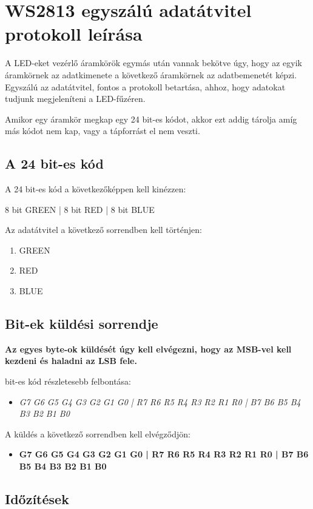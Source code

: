 \documentclass[10pt]{article} %
\begin{document}
\section{WS2813 egyszálú adatátvitel protokoll leírása}

\indent A LED-eket vezérlő áramkörök egymás után vannak bekötve úgy, hogy az egyik áramkörnek az adatkimenete a következő áramkörnek az adatbemenetét képzi. Egyszálú az adatátvitel, fontos a protokoll betartása, ahhoz, hogy adatokat tudjunk megjeleníteni a LED-fűzéren.

Amikor egy áramkör megkap egy 24 bit-es kódot, akkor ezt addig tárolja amíg más kódot nem kap, vagy a tápforrást el nem veszti.

\subsection{A 24 bit-es kód}

A 24 bit-es kód a következőképpen kell kinézzen:

8 bit GREEN | 8 bit RED | 8 bit BLUE

Az adatátvitel a következő sorrendben kell történjen: 
\begin{enumerate}
	\item GREEN
	\item RED
	\item BLUE
\end{enumerate}

\subsection{Bit-ek küldési sorrendje}

\textbf{Az egyes byte-ok küldését úgy kell elvégezni, hogy az MSB-vel kell kezdeni és haladni az LSB fele.}

 bit-es kód részletesebb felbontása: 
\begin{itemize}
\item \textit{G7 G6 G5 G4 G3 G2 G1 G0 | R7 R6 R5 R4 R3 R2 R1 R0 | B7 B6 B5 B4 B3 B2 B1 B0}
\end{itemize}

\noindent A küldés a következő sorrendben kell elvégződjön: 
\begin{itemize}
\item \textbf{G7 G6 G5 G4 G3 G2 G1 G0 | R7 R6 R5 R4 R3 R2 R1 R0 | B7 B6 B5 B4 B3 B2 B1 B0}
\end{itemize}

\subsection{Időzítések}
\end{document}
